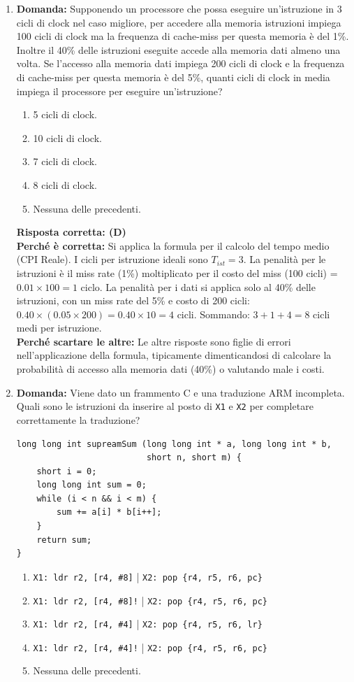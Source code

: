 \documentclass[12pt, a4paper]{article}
\begin{document}
\begin{enumerate}
    \item \textbf{Domanda:} Supponendo un processore che possa eseguire un'istruzione in 3 cicli di clock nel caso migliore, per accedere alla memoria istruzioni impiega 100 cicli di clock ma la frequenza di cache-miss per questa memoria è del 1\%. Inoltre il 40\% delle istruzioni eseguite accede alla memoria dati almeno una volta. Se l'accesso alla memoria dati impiega 200 cicli di clock e la frequenza di cache-miss per questa memoria è del 5\%, quanti cicli di clock in media impiega il processore per eseguire un'istruzione?
    \begin{enumerate}[label=(\Alph*)]
        \item 5 cicli di clock.
        \item 10 cicli di clock.
        \item 7 cicli di clock.
        \item 8 cicli di clock.
        \item Nessuna delle precedenti.
    \end{enumerate}
    \textbf{Risposta corretta: (D)} \\
    \textbf{Perché è corretta:} Si applica la formula per il calcolo del tempo medio (CPI Reale). I cicli per istruzione ideali sono $T_{ist} = 3$. La penalità per le istruzioni è il miss rate (1\%) moltiplicato per il costo del miss (100 cicli) = $0.01 \times 100 = 1$ ciclo. La penalità per i dati si applica solo al 40\% delle istruzioni, con un miss rate del 5\% e costo di 200 cicli: $0.40 \times (0.05 \times 200) = 0.40 \times 10 = 4$ cicli. Sommando: $3 + 1 + 4 = 8$ cicli medi per istruzione. \\
    \textbf{Perché scartare le altre:} Le altre risposte sono figlie di errori nell'applicazione della formula, tipicamente dimenticandosi di calcolare la probabilità di accesso alla memoria dati (40\%) o valutando male i costi.

    \item \textbf{Domanda:} Viene dato un frammento C e una traduzione ARM incompleta. Quali sono le istruzioni da inserire al posto di \texttt{X1} e \texttt{X2} per completare correttamente la traduzione?
\begin{verbatim}
long long int supreamSum (long long int * a, long long int * b, 
                          short n, short m) {
    short i = 0;
    long long int sum = 0;
    while (i < n && i < m) {
        sum += a[i] * b[i++];
    }
    return sum;
}
\end{verbatim}
    \begin{enumerate}[label=(\Alph*)]
        \item \texttt{X1: ldr r2, [r4, \#8]} | \texttt{X2: pop \{r4, r5, r6, pc\}}
        \item \texttt{X1: ldr r2, [r4, \#8]!} | \texttt{X2: pop \{r4, r5, r6, pc\}}
        \item \texttt{X1: ldr r2, [r4, \#4]} | \texttt{X2: pop \{r4, r5, r6, lr\}}
        \item \texttt{X1: ldr r2, [r4, \#4]!} | \texttt{X2: pop \{r4, r5, r6, pc\}}
        \item Nessuna delle precedenti.
    \end{enumerate}


\end{enumerate}
\end{document}
